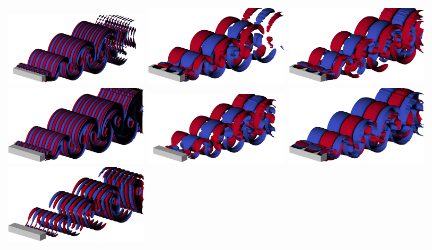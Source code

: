 \begin{figure}
  \includegraphics[width=0.32\textwidth]{./fig/AR1s/Floqetmode_beta_5p5_Re200_AR1_B.png}
  \includegraphics[width=0.32\textwidth]{./fig/AR1s/Floqetmode_beta_1p25_Re200_AR1p25_A.png}
  \includegraphics[width=0.32\textwidth]{./fig/AR1s/Floqetmode_beta_1p25_Re200_AR1p25_Bp.png}
  \includegraphics[width=0.32\textwidth]{./fig/AR1s/Floqetmode_beta_5p5_Re200_AR1p25_B.png}
  \includegraphics[width=0.32\textwidth]{./fig/AR1s/Floqetmode_beta_1p8_Re200_AR1p5_A.png}
  \includegraphics[width=0.32\textwidth]{./fig/AR1s/Floqetmode_beta_1p8_Re200_AR1p5_Bp.png}
  \includegraphics[width=0.32\textwidth]{./fig/AR1s/Floqetmode_beta_3p75_Re200_AR1p5_C.png}

\end{figure}
